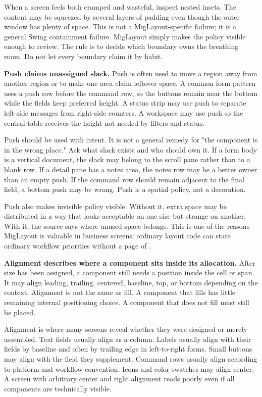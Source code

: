 When a screen feels both cramped and wasteful, inspect nested insets. The
content may be squeezed by several layers of padding even though the outer
window has plenty of space. This is not a MigLayout-specific failure; it is a
general Swing containment failure. MigLayout simply makes the policy visible
enough to review. The rule is to decide which boundary owns the breathing room.
Do not let every boundary claim it by habit.

\textbf{Push claims unassigned slack.} Push is often used to move a region
away from another region or to make one area claim leftover space. A common
form pattern uses a push row before the command row, so the buttons remain near
the bottom while the fields keep preferred height. A status strip may use push
to separate left-side messages from right-side counters. A workspace may use
push so the central table receives the height not needed by filters and status.

Push should be used with intent. It is not a general remedy for "the component
is in the wrong place." Ask what slack exists and who should own it. If a form
body is a vertical document, the slack may belong to the scroll pane rather
than to a blank row. If a detail pane has a notes area, the notes row may be a
better owner than an empty push. If the command row should remain adjacent to
the final field, a bottom push may be wrong. Push is a spatial policy, not a
decoration.

Push also makes invisible policy visible. Without it, extra space may be
distributed in a way that looks acceptable on one size but strange on another.
With it, the source says where unused space belongs. This is one of the reasons
MigLayout is valuable in business screens: ordinary layout code can state
ordinary workflow priorities without a page of .

\textbf{Alignment describes where a component sits inside its allocation.}
After size has been assigned, a component still needs a position inside the
cell or span. It may align leading, trailing, centered, baseline, top, or
bottom depending on the context. Alignment is not the same as fill. A component
that fills has little remaining internal positioning choice. A component that
does not fill must still be placed.

Alignment is where many screens reveal whether they were designed or merely
assembled. Text fields usually align as a column. Labels usually align with
their fields by baseline and often by trailing edge in left-to-right forms.
Small buttons may align with the field they supplement. Command rows usually
align according to platform and workflow convention. Icons and color swatches
may align center. A screen with arbitrary center and right alignment reads
poorly even if all components are technically visible.

